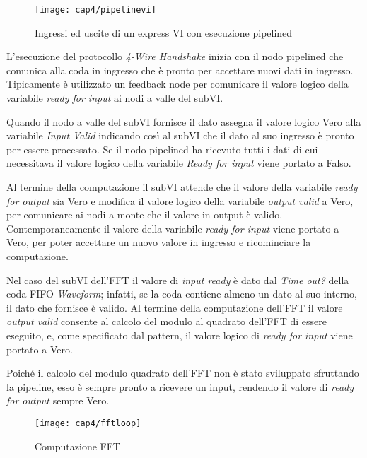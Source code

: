 \begin{figure}  
  \begin{center}
    \texttt{[image: cap4/pipelinevi]}
    \caption{Ingressi ed uscite di un express VI con esecuzione pipelined}
    \label{pipelinevi}
  \end{center}
\end{figure}

L'esecuzione del protocollo \textit{4-Wire Handshake} inizia con il nodo pipelined che comunica alla coda in ingresso che è pronto per accettare nuovi dati in ingresso. Tipicamente è utilizzato un feedback node per comunicare il valore logico della variabile \textit{ready for input} ai nodi a valle del subVI. 

Quando il nodo a valle del subVI fornisce il dato assegna il valore logico Vero alla variabile \textit{Input Valid} indicando così al subVI che il dato al suo ingresso è pronto per essere processato. Se il nodo pipelined ha ricevuto tutti i dati di cui necessitava il valore logico della variabile \textit{Ready for input} viene portato a Falso.

Al termine della computazione il subVI attende che il valore della variabile \textit{ready for output} sia Vero e modifica il valore logico della variabile \textit{output valid} a Vero, per comunicare ai nodi a monte che il valore in output è valido. Contemporaneamente il valore della variabile \textit{ready for input} viene portato a Vero, per poter accettare un nuovo valore in ingresso e ricominciare la computazione.

Nel caso del subVI dell'FFT il valore di \textit{input ready} è dato dal \textit{Time out?} della coda FIFO \textit{Waveform}; infatti, se la coda contiene almeno un dato al suo interno, il dato che fornisce è valido. Al termine della computazione dell'FFT il valore \textit{output valid} consente al calcolo del modulo al quadrato dell'FFT di essere eseguito, e, come specificato dal pattern, il valore logico di \textit{ready for input} viene portato a Vero.

Poiché il calcolo del modulo quadrato dell'FFT non è stato sviluppato sfruttando la pipeline, esso è sempre pronto a ricevere un input, rendendo il valore di \textit{ready for output} sempre Vero.

\begin{figure}  
  \begin{center}
    \texttt{[image: cap4/fftloop]}
    \caption{Computazione FFT}
  \end{center}
\end{figure}

